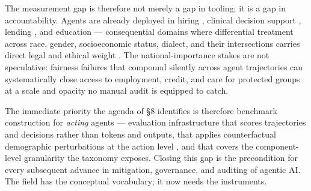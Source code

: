 \documentclass[sigconf,nonacm]{acmart}
\begin{document}
The measurement gap is therefore not merely a gap in tooling; it is a gap in accountability. Agents are already deployed in hiring \cite{veldanda2023emily,wilson2024gender,nghiem2024you}, clinical decision support \cite{poulain2024bias,omar2025sociodemographic,benkirane2024diagnose}, lending \cite{bowen2024measuring,feng2023empowering}, and education \cite{weissburg2024llms,yang2025prompt} — consequential domains where differential treatment across race, gender, socioeconomic status, dialect, and their intersections carries direct legal and ethical weight \cite{bommasani2021opportunities,bender2021dangers}. The national-importance stakes are not speculative: fairness failures that compound silently across agent trajectories \cite{she2025fairsense,hu2022achieving} can systematically close access to employment, credit, and care for protected groups at a scale and opacity no manual audit is equipped to catch.

The immediate priority the agenda of §8 identifies is therefore benchmark construction for \emph{acting} agents — evaluation infrastructure that scores trajectories and decisions rather than tokens and outputs, that applies counterfactual demographic perturbations at the action level \cite{parziale2025systematic,amirimargavi2026equal,basu2026names}, and that covers the component-level granularity the taxonomy exposes. Closing this gap is the precondition for every subsequent advance in mitigation, governance, and auditing of agentic AI. The field has the conceptual vocabulary; it now needs the instruments.



\end{document}

